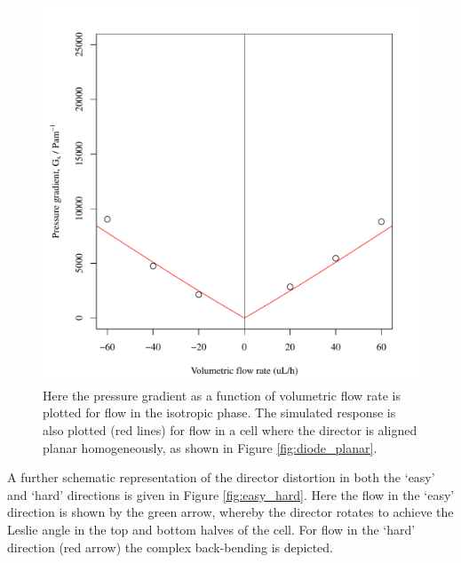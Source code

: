 \begin{figure}
\begin{center}
\includegraphics{Figures/Diode/simulation_new_iso}
\end{center}
\caption[Comparison of experimental data and simulation for flow in the isotropic phase]{\label{fig:simulation_iso}Here the pressure gradient as a function of volumetric flow rate is plotted for flow in the isotropic phase. The simulated response is also plotted (red lines) for  flow in a cell where the director is aligned planar homogeneously, as shown in Figure \ref{fig:diode_planar}.}
\end{figure}

A further schematic representation of the director distortion in both the `easy' and `hard' directions is given in Figure \ref{fig:easy_hard}. Here the flow in the `easy' direction is shown by the green arrow, whereby the director rotates to achieve the Leslie angle in the top and bottom halves of the cell. For flow in the `hard' direction (red arrow) the complex back-bending is depicted.

